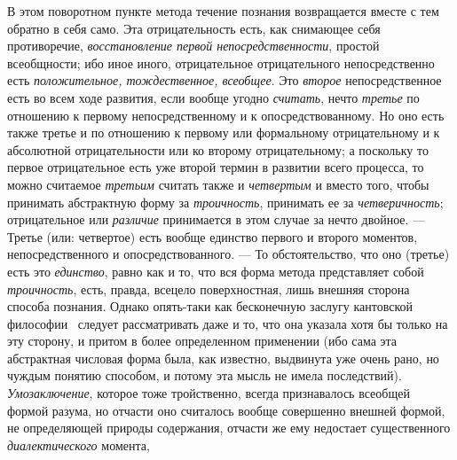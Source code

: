 \documentclass[twoside]{article}
\begin{document}
{{В этом поворотном пункте метода течение познания возвращается
вместе с тем обратно в себя само. Эта отрицательность есть, как снимающее
себя противоречие, {\em восстановление
первой непосредственности}, простой всеобщности; ибо иное
иного, отрицательное отрицательного непосредственно есть
{\em положительное, тождественное,
всеобщее}. Это
{\em второе}
непосредственное есть во всем ходе развития, если вообще
угодно {\em считать},
нечто {\em третье}
по отношению к первому непосредственному и к
опосредствованному. Но оно есть также третье и по отношению к первому или
формальному отрицательному и к абсолютной отрицательности или ко второму
отрицательному; а поскольку то первое отрицательное есть уже второй термин
в развитии всего процесса, то можно считаемое
{\em третьим} считать
также и {\em четвертым} и
вместо того, чтобы принимать абстрактную форму за
{\em троичность},
принимать ее за
{\em четверичность};
отрицательное или
{\em различие}
принимается в этом случае за нечто двойное. —
Третье (или: четвертое) есть вообще единство первого и
второго моментов, непосредственного и опосредствованного. —
То обстоятельство, что оно (третье) есть это
{\em единство}, равно как
и то, что вся форма метода представляет собой
{\em троичность}, есть,
правда, всецело поверхностная, лишь внешняя сторона способа познания.
Однако опять-таки как бесконечную заслугу кантовской
философии~\label{bkm:bm126}
следует рассматривать даже и то, что она указала хотя бы
только на эту сторону, и притом в более определенном применении (ибо сама
эта абстрактная числовая форма была, как известно, выдвинута уже очень
рано, но чуждым понятию способом, и потому эта мысль не имела последствий).
{\em Умозаключение},
которое тоже тройственно, всегда признавалось всеобщей формой
разума, но отчасти оно считалось вообще совершенно внешней формой, не
определяющей природы содержания, отчасти же ему недостает существенного
{\em диалектического}
момента,
}}
\end{document}
